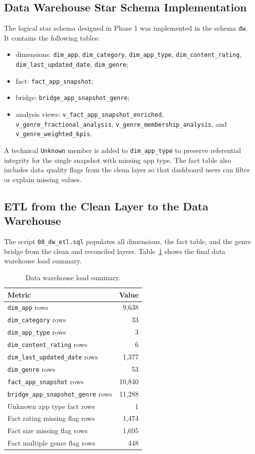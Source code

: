 \documentclass[11pt,a4paper]{article}
\begin{document}
\subsection{Data Warehouse Star Schema Implementation}
The logical star schema designed in Phase 1 was implemented in the schema \texttt{dw}. It contains the following tables:
\begin{itemize}[leftmargin=1.5em]
    \item dimensions: \texttt{dim\_app}, \texttt{dim\_category}, \texttt{dim\_app\_type}, \texttt{dim\_content\_rating}, \texttt{dim\_last\_updated\_date}, \texttt{dim\_genre};
    \item fact: \texttt{fact\_app\_snapshot};
    \item bridge: \texttt{bridge\_app\_snapshot\_genre};
    \item analysis views: \texttt{v\_fact\_app\_snapshot\_enriched}, \texttt{v\_genre\_fractional\_analysis}, \texttt{v\_genre\_membership\_analysis}, and \texttt{v\_genre\_weighted\_kpis}.
\end{itemize}

A technical \texttt{Unknown} member is added to \texttt{dim\_app\_type} to preserve referential integrity for the single snapshot with missing app type. The fact table also includes data quality flags from the clean layer so that dashboard users can filter or explain missing values.

\subsection{ETL from the Clean Layer to the Data Warehouse}
The script \texttt{08\_dw\_etl.sql} populates all dimensions, the fact table, and the genre bridge from the clean and reconciled layers. Table~\ref{tab:dw_load_summary} shows the final data warehouse load summary.

\begin{table}[H]
\centering
\caption{Data warehouse load summary.}
\label{tab:dw_load_summary}
\begin{tabular}{@{}lr@{}}
\toprule
\textbf{Metric} & \textbf{Value} \\
\midrule
\texttt{dim\_app} rows & 9,638 \\
\texttt{dim\_category} rows & 33 \\
\texttt{dim\_app\_type} rows & 3 \\
\texttt{dim\_content\_rating} rows & 6 \\
\texttt{dim\_last\_updated\_date} rows & 1,377 \\
\texttt{dim\_genre} rows & 53 \\
\texttt{fact\_app\_snapshot} rows & 10,840 \\
\texttt{bridge\_app\_snapshot\_genre} rows & 11,288 \\
Unknown app type fact rows & 1 \\
Fact rating missing flag rows & 1,474 \\
Fact size missing flag rows & 1,695 \\
Fact multiple genre flag rows & 448 \\
\bottomrule
\end{tabular}
\end{table}
\end{document}
